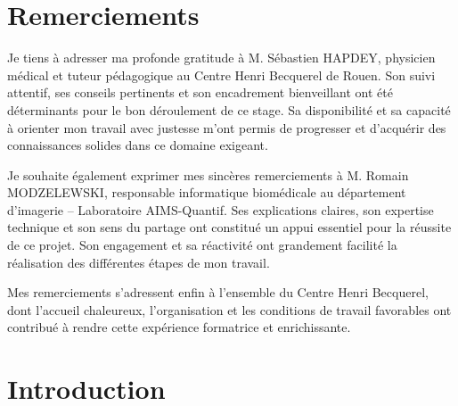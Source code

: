 \documentclass[12pt,a4paper]{report}
\begin{document}


\chapter*{Remerciements}

Je tiens à adresser ma profonde gratitude à M. Sébastien HAPDEY, physicien médical et tuteur pédagogique au Centre Henri Becquerel de Rouen. Son suivi attentif, ses conseils pertinents et son encadrement bienveillant ont été déterminants pour le bon déroulement de ce stage. Sa disponibilité et sa capacité à orienter mon travail avec justesse m'ont permis de progresser et d'acquérir des connaissances solides dans ce domaine exigeant.

Je souhaite également exprimer mes sincères remerciements à M. Romain MODZELEWSKI, responsable informatique biomédicale au département d'imagerie – Laboratoire AIMS-Quantif. Ses explications claires, son expertise technique et son sens du partage ont constitué un appui essentiel pour la réussite de ce projet. Son engagement et sa réactivité ont grandement facilité la réalisation des différentes étapes de mon travail.

Mes remerciements s'adressent enfin à l'ensemble du Centre Henri Becquerel, dont l'accueil chaleureux, l'organisation et les conditions de travail favorables ont contribué à rendre cette expérience formatrice et enrichissante.

\tableofcontents
\newpage

\listoffigures
\newpage

\listoftables
\newpage

\chapter*{Introduction}
\end{document}
